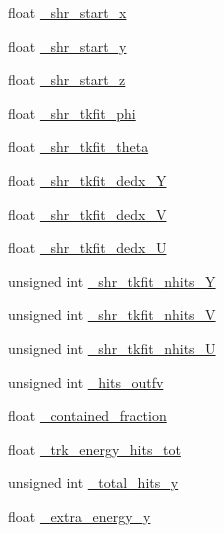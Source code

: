 \begin{DoxyCompactItemize}
\item 
float \hyperlink{classselection_1_1NuMuSelection_af38dabc2591bc0a81c564db0bb773d2c}{\-\_\-shr\-\_\-start\-\_\-x}
\item 
float \hyperlink{classselection_1_1NuMuSelection_af6c46477cac6efcb513d028e39f707d2}{\-\_\-shr\-\_\-start\-\_\-y}
\item 
float \hyperlink{classselection_1_1NuMuSelection_a9ecc838bf83d8279c7e975aff432f06e}{\-\_\-shr\-\_\-start\-\_\-z}
\item 
float \hyperlink{classselection_1_1NuMuSelection_a82badfd521973f96eb8e2b04d2d768f1}{\-\_\-shr\-\_\-tkfit\-\_\-phi}
\item 
float \hyperlink{classselection_1_1NuMuSelection_a8a3b5a7f7bc6fa4a59fbc36bfbf5a835}{\-\_\-shr\-\_\-tkfit\-\_\-theta}
\item 
float \hyperlink{classselection_1_1NuMuSelection_a1a04003daefae9bb8088709dae0705ca}{\-\_\-shr\-\_\-tkfit\-\_\-dedx\-\_\-\-Y}
\item 
float \hyperlink{classselection_1_1NuMuSelection_a9a054c559dfa6e536562f2e74d2954e0}{\-\_\-shr\-\_\-tkfit\-\_\-dedx\-\_\-\-V}
\item 
float \hyperlink{classselection_1_1NuMuSelection_ab7a3a2abb7bf04a5e3d6a190d1c8c415}{\-\_\-shr\-\_\-tkfit\-\_\-dedx\-\_\-\-U}
\item 
unsigned int \hyperlink{classselection_1_1NuMuSelection_a8104bfe11a01a3afc80e48eebf0b4f1f}{\-\_\-shr\-\_\-tkfit\-\_\-nhits\-\_\-\-Y}
\item 
unsigned int \hyperlink{classselection_1_1NuMuSelection_a089d245ba837cfc077d5f30dd1a309b5}{\-\_\-shr\-\_\-tkfit\-\_\-nhits\-\_\-\-V}
\item 
unsigned int \hyperlink{classselection_1_1NuMuSelection_a49ecf4415ef54632faa2317814210b36}{\-\_\-shr\-\_\-tkfit\-\_\-nhits\-\_\-\-U}
\item 
unsigned int \hyperlink{classselection_1_1NuMuSelection_ac2073c16d1ba83437d9fa66b0aa3ea38}{\-\_\-hits\-\_\-outfv}
\item 
float \hyperlink{classselection_1_1NuMuSelection_a5d7cbf03836116170b56615ab3b073c2}{\-\_\-contained\-\_\-fraction}
\item 
float \hyperlink{classselection_1_1NuMuSelection_a62b2fc85963f5b8c09b9a6306afbb84a}{\-\_\-trk\-\_\-energy\-\_\-hits\-\_\-tot}
\item 
unsigned int \hyperlink{classselection_1_1NuMuSelection_a6c1ae5a457aa2734684c6632abf34a8c}{\-\_\-total\-\_\-hits\-\_\-y}
\item 
float \hyperlink{classselection_1_1NuMuSelection_a9bbe9a46450cfb58e3559d943a5822c8}{\-\_\-extra\-\_\-energy\-\_\-y}
\end{DoxyCompactItemize}
